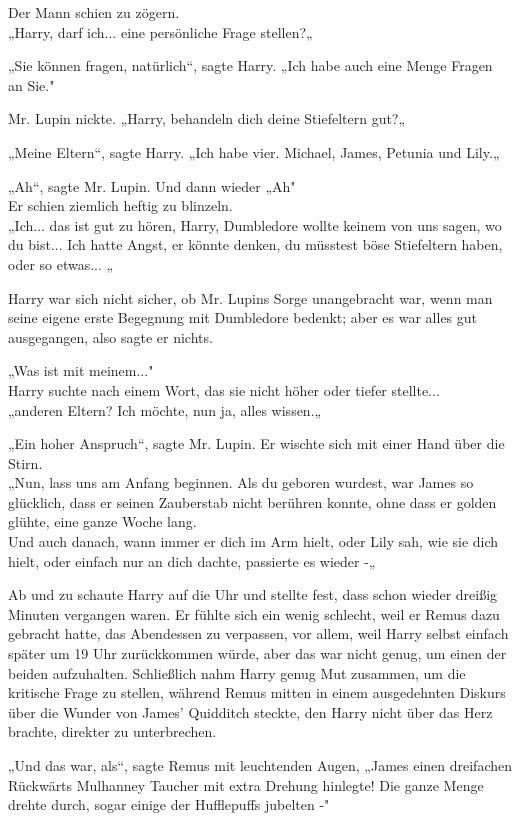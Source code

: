 {Der Mann schien zu zögern.\\ „Harry, darf ich... eine persönliche Frage stellen?„

„Sie können fragen, natürlich“, sagte Harry. „Ich habe auch eine Menge Fragen an Sie."

Mr. Lupin nickte. „Harry, behandeln dich deine Stiefeltern gut?„

„Meine Eltern“, sagte Harry. „Ich habe vier. Michael, James, Petunia und Lily.„

„Ah“, sagte Mr. Lupin. Und dann wieder „Ah"\\ Er schien ziemlich heftig zu blinzeln.\\ „Ich... das ist gut zu hören, Harry, Dumbledore wollte keinem von uns sagen, wo du bist... Ich hatte Angst, er könnte denken, du müsstest böse Stiefeltern haben, oder so etwas... „

Harry war sich nicht sicher, ob Mr. Lupins Sorge unangebracht war, wenn man seine eigene erste Begegnung mit Dumbledore bedenkt; aber es war alles gut ausgegangen, also sagte er nichts.

„Was ist mit meinem..."\\ Harry suchte nach einem Wort, das sie nicht höher oder tiefer stellte...\\ „anderen Eltern? Ich möchte, nun ja, alles wissen.„

„Ein hoher Anspruch“, sagte Mr. Lupin. Er wischte sich mit einer Hand über die Stirn.\\ „Nun, lass uns am Anfang beginnen. Als du geboren wurdest, war James so glücklich, dass er seinen Zauberstab nicht berühren konnte, ohne dass er golden glühte, eine ganze Woche lang.\\ Und auch danach, wann immer er dich im Arm hielt, oder Lily sah, wie sie dich hielt, oder einfach nur an dich dachte, passierte es wieder -„

Ab und zu schaute Harry auf die Uhr und stellte fest, dass schon wieder dreißig Minuten vergangen waren. Er fühlte sich ein wenig schlecht, weil er Remus dazu gebracht hatte, das Abendessen zu verpassen, vor allem, weil Harry selbst einfach später um 19 Uhr zurückkommen würde, aber das war nicht genug, um einen der beiden aufzuhalten. Schließlich nahm Harry genug Mut zusammen, um die kritische Frage zu stellen, während Remus mitten in einem ausgedehnten Diskurs über die Wunder von James' Quidditch steckte, den Harry nicht über das Herz brachte, direkter zu unterbrechen.

„Und das war, als“, sagte Remus mit leuchtenden Augen, „James einen dreifachen Rückwärts Mulhanney Taucher mit extra Drehung hinlegte! Die ganze Menge drehte durch, sogar einige der Hufflepuffs jubelten -"

}
